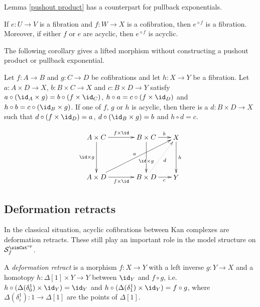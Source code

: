 \documentclass{tac}
\newcommand\hide[1]{}
\newcommand\cat\mathcal
\newcommand\dual{^{\mathrm{op}}}
\newcommand\s{^{\simCat\dual}}
\newcommand\of{:}
\newcommand\simplex\Delta
\newcommand\f{_f}
\newcommand\pe[1]{^{\diamond #1}}
\begin{document}
Lemma \ref{pushout product} has a counterpart for pullback exponentials.

\begin{corollary} If $e\of U\to V$ is a fibration and $f\of W\to X$ is a cofibration, then $e\pe f$ is a fibration. Moreover, if either $f$ or $e$ are acyclic, then $e\pe f$ is acyclic. \label{pullback exponential}
\end{corollary}

The following corollary gives a lifted morphism without constructing a pushout product or pullback exponential.

\begin{corollary} Let $f\of A\to B$ and $g\of C\to D$ be cofibrations and let $h\of X\to Y$ be a fibration. Let $a\of A\times D\to X$, $b\of B\times C\to X$ and $c\of B \times D\to Y$ satisfy $a\circ(\id_A\times g) = b\circ(f\times \id_C)$, $h\circ a=c\circ(f\times \id_D)$ and $h\circ b=c\circ(\id_B\times g)$. If one of $f$, $g$ or $h$ is acyclic, then there is a $d\of B\times D\to X$ such that $d\circ(f\times\id_D)=a$, $d\circ(\id_B\times g)=b$ and $h\circ d = c$.
\hide{\[\xymatrix{
A\times C\ar[r]^{f\times \id}\ar[d]_{\id\times g} & B\times C\ar[r]^b\ar[d]_(.3){\id\times g} & X\ar[d]^h\\
A\times D\ar[r]_{f\times \id} \ar[urr]^(.3){a} & B\times D \ar[r]_c \ar@{.>}[ur]_{d} & Y
}\]}
\[\xy
(0,20)*+{A\times C}="AC",(25,20)*+{B\times C}="BC",(40,20)*+{X}="X",
(0,0)*+{A\times D}="AD",(25,0)*+{B\times D}="BD",(40,0)*+{Y}="Y"
\ar^{f\times\id} "AC";"BC"
\ar_{\id\times g} "AC";"AD"
\ar_{f\times\id} "AD";"BD"
\ar^{a} "AD";"X"
\ar|(.6){\id\times g} "BC";"BD"
\ar^(.6){b} "BC";"X"
\ar@{.>}_{d} "BD";"X"
\ar_(.6){c} "BD";"Y"
\ar^{h} "X";"Y"
\endxy\]

\hide{Transposed view:
\[\xymatrix{
A\ar[r]^{a^t}\ar[d]_f & X^D\ar[r]^{X^g}\ar[d]^(.7){h^D} & X^C\ar[d]^{h^C}\\
B\ar[r]_{c^t} \ar[urr]_(.7){b^t} \ar@{.>}[ur]^{d^t} & Y^D \ar[r]_{Y^g} & Y^C
}\]}\label{triple lift}
\end{corollary}


\subsection{Deformation retracts}
In the classical situation, acyclic cofibrations between Kan complexes are deformation retracts. These still play an important role in the model structure on $\cat S\s\f$.

\begin{definition} A \emph{deformation retract} is a morphism $f\of X\to Y$ with a left inverse $g\of Y\to X$ and a homotopy $h\of \simplex[1]\times Y\to Y$ between $\id_Y$ and $f\circ g$, i.e.\ $h\circ (\Delta(\delta^1_0)\times \id_Y) = \id_Y$ and $h\circ (\Delta(\delta^1_1)\times \id_Y) = f\circ g$, where $\Delta(\delta^1_i)\of 1\to \simplex[1]$ are the points of $\simplex[1]$.
\end{definition}
\end{document}
